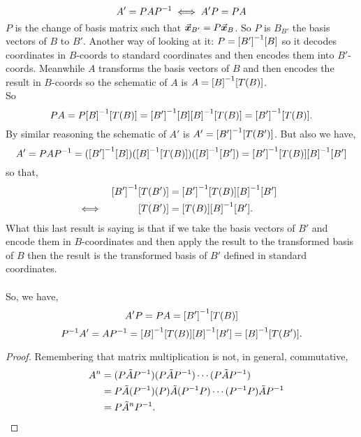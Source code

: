 \documentclass[../MathsNotesBase.tex]{subfiles}
\begin{document}
{		
		\biggerskip
		\[ A' = PA{P}^{-1} \iff A'P = PA \]
		$P$ is the change of basis matrix such that ${ \vec{\bm{x}}_{B'} = P\vec{\bm{x}}_B }$. So $P$ is $B_{B'}$ the basis vectors of $B$ \wrt to $B'$. Another way of looking at it: ${ P = {[B']}^{-1}[B] }$ so it decodes coordinates in $B$-coords to standard coordinates and then encodes them into $B'$-coords. Meanwhile $A$ transforms the basis vectors of $B$ and then encodes the result in $B$-coords so the schematic of $A$ is ${ A = {[B]}^{-1}[T(B)] }$.\\
		So 
		\[ PA = P{[B]}^{-1}[T(B)] = {[B']}^{-1}[B]{[B]}^{-1}[T(B)] = {[B']}^{-1}[T(B)]. \]
		By similar reasoning the schematic of $A'$ is ${ A' = {[B']}^{-1}[T(B')] }$. But also we have,
		\[ A' = PA{P}^{-1} = ({[B']}^{-1}[B])({[B]}^{-1}[T(B)])({[B]}^{-1}[B']) = {[B']}^{-1}[T(B)]{[B]}^{-1}[B'] \]
		so that,
		\begin{align*}
			&& {[B']}^{-1}[T(B')] &= {[B']}^{-1}[T(B)]{[B]}^{-1}[B'] \\
			&\iff & [T(B')] &= [T(B)]{[B]}^{-1}[B']. &\text{\scriptsize{}} \\
		\end{align*}
		What this last result is saying is that if we take the basis vectors of $B'$ and encode them in $B$-coordinates and then apply the result to the transformed basis of $B$ then the result is the transformed basis of $B'$ defined in standard coordinates.\\\\
		So, we have,
		\[ A'P = PA = {[B']}^{-1}[T(B)] \]
		\[ {P}^{-1}A' = A{P}^{-1} = {[B]}^{-1}[T(B)]{[B]}^{-1}[B'] = {[B]}^{-1}[T(B')]. \]
		
		
		\bigskip
		\begin{tcolorbox}[breakable,enhanced jigsaw,colframe=white,colback=white,boxrule=0pt,arc=0pt,left=0pt,right=0pt,top=0pt,bottom=0pt]
			\begin{proof}
				Remembering that matrix multiplication is not, in general, commutative,
				\begin{align*}
					&& A^n &= (P \tilde{A} {P}^{-1})(P \tilde{A} {P}^{-1})\cdots(P \tilde{A} {P}^{-1}) \\
					&&  &= P \tilde{A} ({P}^{-1})(P) \tilde{A} ({P}^{-1}P) \cdots ({P}^{-1}P) \tilde{A} {P}^{-1} \\
					&&  &= P \tilde{A}^n {P}^{-1}. \qedhere
				\end{align*}
			\end{proof}
		\end{tcolorbox}
		
}
\end{document}
